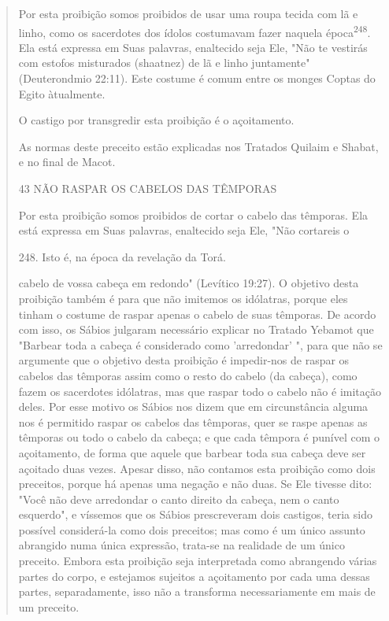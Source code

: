 \begin{quote}
Por esta proibição somos proibidos de usar uma roupa tecida com lã e
linho, como os sacerdotes dos ídolos costumavam fazer naquela
época\textsuperscript{248}. Ela está expressa em Suas palavras,
enaltecido seja Ele, "Não te vestirás com estofos misturados (shaatnez)
de lã e linho juntamente" (Deuterondmio 22:11). Este costume é comum
entre os monges Coptas do Egito àtualmente.

O castigo por transgredir esta proibição é o açoitamento.

As normas deste preceito estão explicadas nos Tratados Quilaim e Shabat,
e no final de Macot.

43 NÃO RASPAR OS CABELOS DAS TÊMPORAS

Por esta proibição somos proibidos de cortar o cabelo das têmpo­ras. Ela
está expressa em Suas palavras, enaltecido seja Ele, "Não cortareis o

248. Isto é, na época da revelação da Torá.

cabelo de vossa cabeça em redondo" (Levítico 19:27). O objetivo desta
proibi­ção também é para que não imitemos os idólatras, porque eles
tinham o costu­me de raspar apenas o cabelo de suas têmporas. De acordo
com isso, os Sábios julgaram necessário explicar no Tratado Yebamot que
"Barbear toda a cabeça é considerado como 'arredondar' ", para que não
se argumente que o objetivo desta proibição é impedir-nos de raspar os
cabelos das têmporas assim como o resto do cabelo (da cabeça), como
fazem os sacerdotes idólatras, mas que ras­par todo o cabelo não é
imitação deles. Por esse motivo os Sábios nos dizem que em circunstância
alguma nos é permitido raspar os cabelos das têmporas, quer se raspe
apenas as têmporas ou todo o cabelo da cabeça; e que cada têm­pora é
punível com o açoitamento, de forma que aquele que barbear toda sua
cabeça deve ser açoitado duas vezes. Apesar disso, não contamos esta
proibi­ção como dois preceitos, porque há apenas uma negação e não duas.
Se Ele tivesse dito: "Você não deve arredondar o canto direito da
cabeça, nem o can­to esquerdo", e víssemos que os Sábios prescreveram
dois castigos, teria sido possível considerá-la como dois preceitos; mas
como é um único assunto abran­gido numa única expressão, trata-se na
realidade de um único preceito. Embo­ra esta proibição seja interpretada
como abrangendo várias partes do corpo, e estejamos sujeitos a
açoitamento por cada uma dessas partes, separadamente, isso não a
transforma necessariamente em mais de um preceito.


\end{quote}
